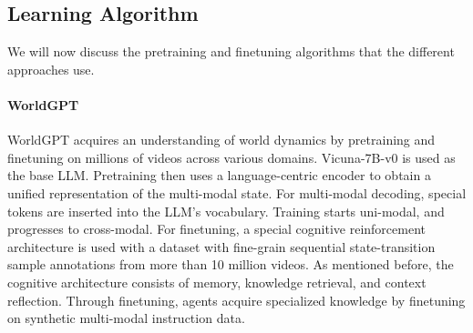 \subsection{Learning Algorithm}
We will now discuss the pretraining and finetuning  algorithms that the different approaches use. %

\paragraph{WorldGPT}
WorldGPT acquires an understanding of world
dynamics by pretraining and finetuning on millions of videos across various domains. Vicuna-7B-v0 is used as the base LLM. Pretraining then uses a language-centric encoder to obtain a unified representation of the multi-modal state. For multi-modal decoding, special tokens are inserted into the LLM's vocabulary. Training starts uni-modal, and progresses to cross-modal.  For finetuning, a special cognitive reinforcement architecture is used with a dataset with fine-grain sequential state-transition sample annotations from more than 10 million videos. As mentioned before, the cognitive architecture consists of memory, knowledge retrieval, and context reflection. Through finetuning, agents  acquire specialized knowledge by finetuning on synthetic multi-modal instruction data.%

